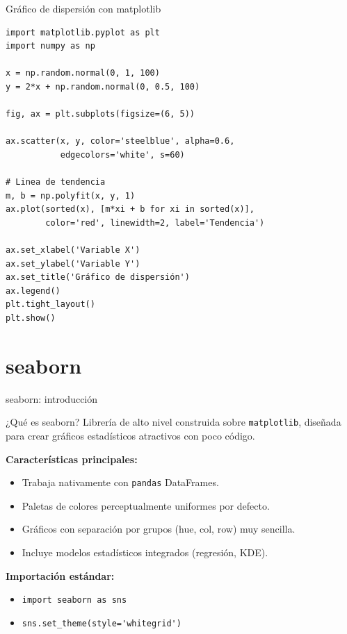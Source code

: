 \documentclass[aspectratio=169]{beamer}
\begin{document}
\begin{frame}[fragile]{Gráfico de dispersión con matplotlib}
\begin{lstlisting}[style=python]
import matplotlib.pyplot as plt
import numpy as np

x = np.random.normal(0, 1, 100)
y = 2*x + np.random.normal(0, 0.5, 100)

fig, ax = plt.subplots(figsize=(6, 5))

ax.scatter(x, y, color='steelblue', alpha=0.6,
           edgecolors='white', s=60)

# Linea de tendencia
m, b = np.polyfit(x, y, 1)
ax.plot(sorted(x), [m*xi + b for xi in sorted(x)],
        color='red', linewidth=2, label='Tendencia')

ax.set_xlabel('Variable X')
ax.set_ylabel('Variable Y')
ax.set_title('Gráfico de dispersión')
ax.legend()
plt.tight_layout()
plt.show()
\end{lstlisting}
\end{frame}

\section{seaborn}

\begin{frame}{seaborn: introducción}
  \begin{block}{¿Qué es seaborn?}
    Librería de alto nivel construida sobre \texttt{matplotlib}, diseñada para crear gráficos estadísticos atractivos con poco código.
  \end{block}
  \bigskip
  \textbf{Características principales:}
  \begin{itemize}
    \item Trabaja nativamente con \texttt{pandas} DataFrames.
    \item Paletas de colores perceptualmente uniformes por defecto.
    \item Gráficos con separación por grupos (hue, col, row) muy sencilla.
    \item Incluye modelos estadísticos integrados (regresión, KDE).
  \end{itemize}
  \bigskip
  \textbf{Importación estándar:}
  \begin{itemize}
    \item \lstinline[style=python]|import seaborn as sns|
    \item \lstinline[style=python]|sns.set_theme(style='whitegrid')|
  \end{itemize}
\end{frame}
\end{document}
